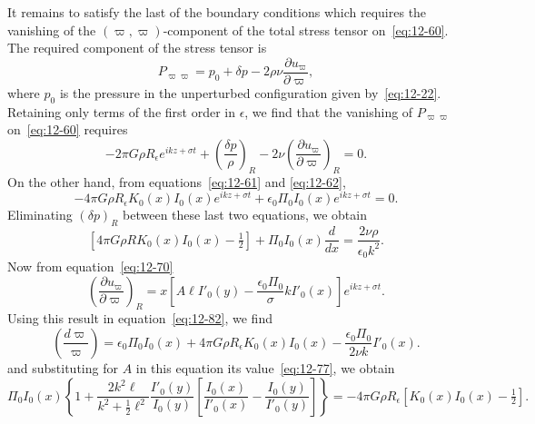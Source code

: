 It remains to satisfy the last of the boundary conditions which requires the vanishing of the $(\varpi,\varpi)$-component of the total stress tensor on~\eqref{eq:12-60}. The required component of the stress tensor is
\begin{equation}
\label{eq:12-79}
P_{\varpi\varpi} = p_0 + \delta p - 2\rho\nu \frac{\partial u_\varpi}{\partial \varpi},
\end{equation}
where $p_0$ is the pressure in the unperturbed configuration given by~\eqref{eq:12-22}. Retaining only terms of the first order in $\epsilon$, we find that the vanishing of $P_{\varpi\varpi}$ on~\eqref{eq:12-60} requires
\begin{equation}
\label{eq:12-80}
-2\pi G\rho R_\epsilon e^{ikz+\sigma t} + \left(\frac{\delta p}{\rho}\right)_R - 2\nu\left(\frac{\partial u_\varpi}{\partial \varpi}\right)_R = 0.
\end{equation}
On the other hand, from equations~\eqref{eq:12-61} and \eqref{eq:12-62},
\begin{equation}
\label{eq:12-81}
-4\pi G\rho R_\epsilon K_0(x) I_0(x) e^{ikz+\sigma t} + \epsilon_0 \Pi_0 I_0(x) e^{ikz+\sigma t} = 0.
\end{equation}
Eliminating $(\delta p)_R$ between these last two equations, we obtain
\begin{equation}
\label{eq:12-82}
[4\pi G\rho R K_0(x) I_0(x) - \tfrac{1}{2}] + \Pi_0 I_0(x) \frac{d}{dx} = \frac{2\nu\rho}{\epsilon_0 k^2}.
\end{equation}
Now from equation~\eqref{eq:12-70}
\begin{equation}
\label{eq:12-83}
\left(\frac{\partial u_\varpi}{\partial \varpi}\right)_R = x \left[A\ell I'_0(y) - \frac{\epsilon_0 \Pi_0}{\sigma}k I'_0(x)\right] e^{ikz+\sigma t}.
\end{equation}
Using this result in equation~\eqref{eq:12-82}, we find
\begin{equation}
\label{eq:12-84}
\left(\frac{d\varpi}{\varpi}\right) = \epsilon_0 \Pi_0 I_0(x) + 4\pi G\rho R_\epsilon K_0(x) I_0(x) - \frac{\epsilon_0 \Pi_0}{2\nu k} I'_0(x).
\end{equation}
and substituting for $A$ in this equation its value~\eqref{eq:12-77}, we obtain
\begin{equation}
\label{eq:12-85}
\Pi_0 I_0(x) \left\{1 + \frac{2k^2\ell}{k^2+\frac{1}{2}\ell^2} \frac{I'_0(y)}{I_0(y)} \left[\frac{I_0(x)}{I'_0(x)} - \frac{I_0(y)}{I'_0(y)}\right]\right\} = -4\pi G\rho R_\epsilon [K_0(x)I_0(x) - \tfrac{1}{2}].
\end{equation}
